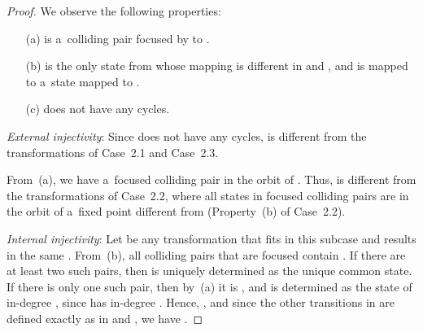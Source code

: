 \documentclass{amsart}
\begin{document}
\begin{proof}
We observe the following properties:
\begin{enumerate}
\item[(a)]  is a~colliding pair focused by  to .

\item[(b)]  is the only state from  whose mapping is different in  and , and  is mapped to a~state mapped to .

\item[(c)]  does not have any cycles.
\end{enumerate}

\textit{External injectivity}:
Since  does not have any cycles,  is different from the transformations of Case~2.1 and Case~2.3.

From~(a), we have a~focused colliding pair in the orbit of . Thus,  is different from the transformations of Case~2.2, where all states in focused colliding pairs are in the orbit of a~fixed point different from  (Property~(b) of Case~2.2).

\textit{Internal injectivity}:
Let  be any transformation that fits in this subcase and results in the same .
From~(b), all colliding pairs that are focused contain .
If there are at least two such pairs, then  is uniquely determined as the unique common state.
If there is only one such pair, then by~(a) it is , and  is determined as the state of in-degree , since  has in-degree .
Hence, , and since the other transitions in  are defined exactly as in  and , we have .


\end{proof}
\end{document}
